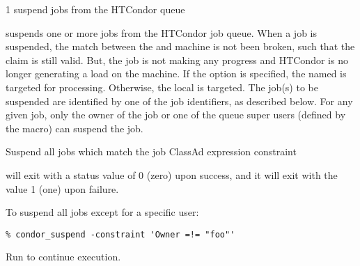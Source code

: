 \begin{ManPage}{\label{man-condor-suspend}}{1}
{suspend jobs from the HTCondor queue}

\Synopsis {}
\ToolArgsBase

\ToolDebugOption
\ToolLocate
{}

\Description

 suspends one or more jobs from the HTCondor job queue.  
When a job is suspended,
the match between the  and machine is not been broken,
such that the claim is still valid.
But, the job is not making any progress and HTCondor is no longer 
generating a load on the machine.
If the  option is specified, the named  is targeted
for processing.  
Otherwise, the local  is targeted.
The job(s) to be suspended are identified by one of the job identifiers, as
described below.
For any given job, only the owner of the job or one of the queue super users
(defined by the  macro) can suspend the job.

\begin{Options}
	\ToolArgsBaseDesc
	\ToolLocateDesc
    \ToolDebugDesc
	 {Suspend all jobs which match
	                the job ClassAd expression constraint}
\end{Options}

\ExitStatus

 will exit with a status value of 0 (zero) upon success,
and it will exit with the value 1 (one) upon failure.

\Examples
To suspend all jobs except for a specific user:
\footnotesize
\begin{verbatim}
% condor_suspend -constraint 'Owner =!= "foo"'
\end{verbatim}
\normalsize

Run  to continue execution.
\end{ManPage}
